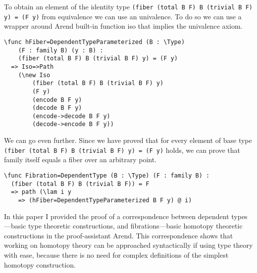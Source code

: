 To obtain an element of the identity type \texttt{(fiber (total B F) B (trivial B F) y) = (F y)} from equivalence we can use an univalence. To do so we can use a wrapper around Arend built-in function iso that implies the univalence axiom.

\begin{ListingEnv}[H]
\begin{lstlisting}
\func hFiber=DependentTypeParameterized (B : \Type) 
	(F : family B) (y : B) : 
	(fiber (total B F) B (trivial B F) y) = (F y)
  => Iso=>Path 
  	(\new Iso 
  		(fiber (total B F) B (trivial B F) y) 
  		(F y) 
  		(encode B F y) 
  		(decode B F y) 
  		(encode->decode B F y) 
  		(decode->encode B F y))
\end{lstlisting}
\end{ListingEnv}

We can go even further. Since we have proved that for every element of base type \texttt{(fiber (total B F) B (trivial B F) y) = (F y)} holds, we can prove that family itself equals a fiber over an arbitrary point.

\begin{ListingEnv}[H]
\begin{lstlisting}
\func Fibration=DependentType (B : \Type) (F : family B) : 
  (fiber (total B F) B (trivial B F)) = F
  => path (\lam i y
    => (hFiber=DependentTypeParameterized B F y) @ i)
\end{lstlisting}
\end{ListingEnv}

\Conc

In this paper I provided the proof of a correspondence between dependent types---basic type theoretic constructions, and fibrations---basic homotopy theoretic constructions in the proof-assistant Arend. This correspondence shows that working on homotopy theory can be approached syntactically if using type theory with ease, because there is no need for complex definitions of the simplest homotopy construction.

\begin{otherlanguage}{english}
\printbibliography[
    heading=bibintoc
    ,title=Bibliography
]
\end{otherlanguage}



